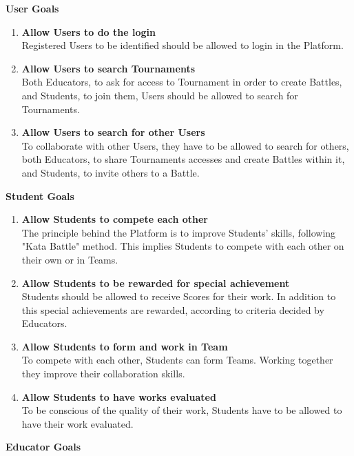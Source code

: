 \textbf{User Goals}
    \begin{enumerate}[label=\textbf{GU\arabic*:}]
        \item \textbf{Allow Users to do the login}\\Registered Users to be identified should be allowed to login in the Platform.
        \item \textbf{Allow Users to search Tournaments}\\Both Educators, to ask for access to Tournament in order to create Battles, and Students, to join them, Users should be allowed to search for Tournaments.
        \item \textbf{Allow Users to search for other Users}\\To collaborate with other Users, they have to be allowed to search for others, both Educators, to share Tournaments accesses and create Battles within it, and Students, to invite others to a Battle.
    \end{enumerate}
\textbf{Student Goals}
\begin{enumerate}[label=\textbf{GS\arabic*:}]
    \item \textbf{Allow Students to compete each other}\\The principle behind the Platform is to improve Students' skills, following "Kata Battle" method. This implies Students to compete with each other on their own or in Teams.
    \item \textbf{Allow Students to be rewarded for special achievement}\\Students should be allowed to receive Scores for their work. In addition to this special achievements are rewarded, according to criteria decided by Educators.
    \item \textbf{Allow Students to form and work in Team}\\To compete with each other, Students can form Teams. Working together they improve their collaboration skills.
    \item \textbf{Allow Students to have works evaluated}\\To be conscious of the quality of their work, Students have to be allowed to have their work evaluated.
\end{enumerate}
\textbf{Educator Goals}
